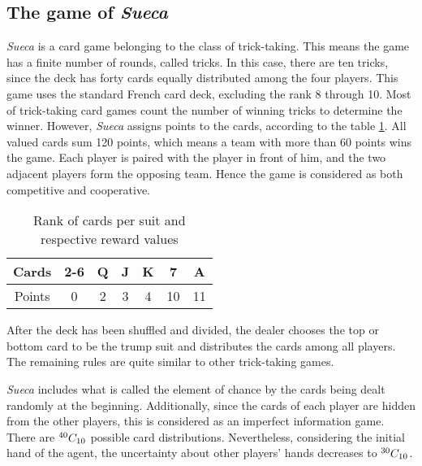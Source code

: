 \subsection{The game of \emph{Sueca}}

\emph{Sueca} is a card game belonging to the class of trick-taking.
This means the game has a finite number of rounds, called tricks.
In this case, there are ten tricks, since the deck has forty cards equally distributed among the four players.
This game uses the standard French card deck, excluding the rank 8 through 10.
Most of trick-taking card games count the number of winning tricks to determine the winner.
However, \emph{Sueca} assigns points to the cards, according to the table \ref{points-table}.
All valued cards sum 120 points, 
which means a team with more than 60 points wins the game.
Each player is paired with the player in front of him, and the two adjacent players form the opposing team.
Hence the game is considered as both competitive and cooperative.

\begin{table}[ht]
\centering
\begin{tabular}{|c|c|c|c|c|c|c|}
\hline
Cards  & 2-6 & Q & J & K & 7  & A  \\ \hline
Points & 0   & 2 & 3 & 4 & 10 & 11 \\ \hline
\end{tabular}
\caption{Rank of cards per suit and respective reward values}
\label{points-table}
\end{table}

After the deck has been shuffled and divided, the dealer chooses the top or bottom card to be the trump suit and distributes the cards among all players.
The remaining rules are quite similar to other trick-taking games.

\emph{Sueca} includes what is called the element of chance by the cards being dealt randomly at the beginning.
Additionally, since the cards of each player are hidden from the other players, this is considered as an imperfect information game.
There are ${}^{40}C_{10}$ possible card distributions.
Nevertheless, considering the initial hand of the agent, the uncertainty about other players' hands decreases to ${}^{30}C_{10}$.